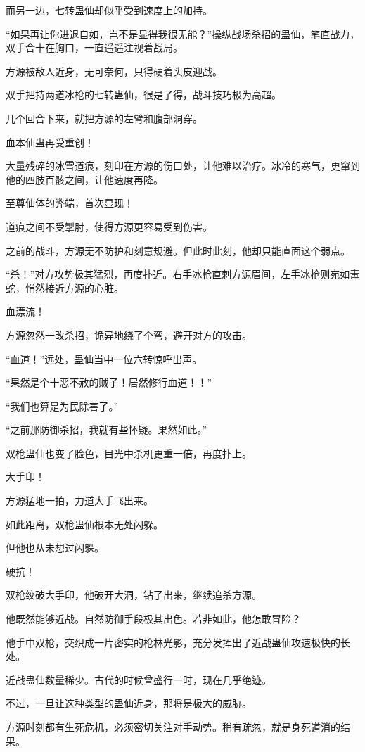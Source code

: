 \begin{this_body}
而另一边，七转蛊仙却似乎受到速度上的加持。

“如果再让你进退自如，岂不是显得我很无能？”操纵战场杀招的蛊仙，笔直战力，双手合十在胸口，一直遥遥注视着战局。

方源被敌人近身，无可奈何，只得硬着头皮迎战。

双手把持两道冰枪的七转蛊仙，很是了得，战斗技巧极为高超。

几个回合下来，就把方源的左臂和腹部洞穿。

血本仙蛊再受重创！

大量残碎的冰雪道痕，刻印在方源的伤口处，让他难以治疗。冰冷的寒气，更窜到他的四肢百骸之间，让他速度再降。

至尊仙体的弊端，首次显现！

道痕之间不受掣肘，使得方源更容易受到伤害。

之前的战斗，方源无不防护和刻意规避。但此时此刻，他却只能直面这个弱点。

“杀！”对方攻势极其猛烈，再度扑近。右手冰枪直刺方源眉间，左手冰枪则宛如毒蛇，悄然接近方源的心脏。

血漂流！

方源忽然一改杀招，诡异地绕了个弯，避开对方的攻击。

“血道！”远处，蛊仙当中一位六转惊呼出声。

“果然是个十恶不赦的贼子！居然修行血道！！”

“我们也算是为民除害了。”

“之前那防御杀招，我就有些怀疑。果然如此。”

双枪蛊仙也变了脸色，目光中杀机更重一倍，再度扑上。

大手印！

方源猛地一拍，力道大手飞出来。

如此距离，双枪蛊仙根本无处闪躲。

但他也从未想过闪躲。

硬抗！

双枪绞破大手印，他破开大洞，钻了出来，继续追杀方源。

他既然能够近战。自然防御手段极其出色。若非如此，他怎敢冒险？

他手中双枪，交织成一片密实的枪林光影，充分发挥出了近战蛊仙攻速极快的长处。

近战蛊仙数量稀少。古代的时候曾盛行一时，现在几乎绝迹。

不过，一旦让这种类型的蛊仙近身，那将是极大的威胁。

方源时刻都有生死危机，必须密切关注对手动势。稍有疏忽，就是身死道消的结果。


\end{this_body}
